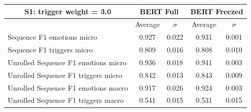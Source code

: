 \documentclass[11pt,table,xcdraw]{article}
\begin{document}
\begin{table}[h]
\bigskip
\begin{tabular}{|l|cc|cc|}
\hline
\multicolumn{1}{|c|}{\textbf{S1: trigger weight = 3.0}}              & \multicolumn{2}{c|}{BERT Full}                                                     & \multicolumn{2}{c|}{BERT Freezed}                                                  \\ \hline
\multicolumn{1}{|c|}{}              & \multicolumn{1}{c|}{Average}                       & $\sigma$                         & \multicolumn{1}{c|}{Average}                       & $\sigma$                         \\ \hline
Sequence F1 emotions micro          & \multicolumn{1}{c|}{\cellcolor[HTML]{009901}0.927} & \cellcolor[HTML]{FFFFFF}0.022 & \multicolumn{1}{c|}{\cellcolor[HTML]{009901}0.931} & \cellcolor[HTML]{FFFFFF}0.001 \\ \hline
Sequence F1 triggers micro          & \multicolumn{1}{c|}{\cellcolor[HTML]{34FF34}0.809} & \cellcolor[HTML]{FFFFFF}0.016 & \multicolumn{1}{c|}{\cellcolor[HTML]{34FF34}0.808} & \cellcolor[HTML]{FFFFFF}0.010 \\ \hline
Unrolled Sequence F1 emotions micro & \multicolumn{1}{c|}{\cellcolor[HTML]{009901}0.936} & \cellcolor[HTML]{FFFFFF}0.018 & \multicolumn{1}{c|}{\cellcolor[HTML]{009901}0.941} & \cellcolor[HTML]{FFFFFF}0.003 \\ \hline
Unrolled Sequence F1 triggers micro & \multicolumn{1}{c|}{\cellcolor[HTML]{34FF34}0.842} & \cellcolor[HTML]{FFFFFF}0.013 & \multicolumn{1}{c|}{\cellcolor[HTML]{34FF34}0.843} & \cellcolor[HTML]{FFFFFF}0.009 \\ \hline
Unrolled Sequence F1 emotions macro & \multicolumn{1}{c|}{\cellcolor[HTML]{009901}0.917} & \cellcolor[HTML]{FFFFFF}0.026 & \multicolumn{1}{c|}{\cellcolor[HTML]{009901}0.924} & \cellcolor[HTML]{FFFFFF}0.003 \\ \hline
Unrolled Sequence F1 triggers macro & \multicolumn{1}{c|}{\cellcolor[HTML]{F8A102}0.541} & \cellcolor[HTML]{FFFFFF}0.015 & \multicolumn{1}{c|}{\cellcolor[HTML]{F8A102}0.531} & \cellcolor[HTML]{FFFFFF}0.015 \\ \hline
\end{tabular}


\end{table}
\end{document}
